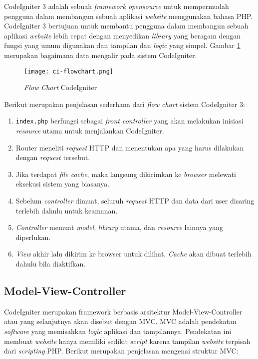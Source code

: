 CodeIgniter 3 adalah sebuah \textit{framework opensource} untuk mempermudah pengguna dalam membangun sebuah aplikasi \textit{website} menggunakan bahasa PHP. CodeIgniter 3 bertujuan untuk membantu pengguna dalam membangun sebuah aplikasi \textit{website} lebih cepat dengan menyedikan \textit{library} yang beragam dengan fungsi yang umum digunakan dan tampilan dan \textit{logic} yang simpel. Gambar \ref{fig:2:ciflowchart} merupakan bagaimana data mengalir pada sistem CodeIgniter.

\begin{figure}[H]
	\centering
	\texttt{[image: ci-flowchart.png]}
	\caption{\textit{Flow Chart} CodeIgniter}
	\label{fig:2:ciflowchart}
\end{figure}

Berikut merupakan penjelasan sederhana dari \textit{flow chart} sistem CodeIgniter 3:

\begin{enumerate}
	\item \verb|index.php| berfungsi sebagai \textit{front controller} yang akan melakukan inisiasi \textit{resource} utama untuk menjalankan CodeIgniter.
	\item Router meneliti \textit{request} HTTP dan menentukan apa yang harus dilakukan dengan \textit{request} tersebut.
	\item Jika terdapat \textit{file cache}, maka langsung dikirimkan ke \textit{browser} melewati eksekusi sistem yang biasanya.
	\item Sebelum \textit{controller} dimuat, seluruh \textit{request} HTTP dan data dari user disaring terlebih dahulu untuk keamanan.
	\item \textit{Controller} memuat \textit{model}, \textit{library} utama, dan \textit{resource} lainnya yang diperlukan.
	\item \textit{View} akhir lalu dikirim ke browser untuk dilihat. \textit{Cache} akan dibuat terlebih dahulu bila diaktifkan.
\end{enumerate}

\subsection{Model-View-Controller}
\label{sub:2:2:modelviewcontroller}

CodeIgniter merupakan framework berbasis arsitektur Model-View-Controller atau yang selanjutnya akan disebut dengan MVC. MVC adalah pendekatan \textit{software} yang memisahkan \textit{logic} aplikasi dan tampilannya. Pendekatan ini membuat \textit{website} hanya memiliki sedikit \textit{script} karena tampilan \textit{website} terpisah dari \textit{scripting} PHP. Berikut merupakan penjelasan mengenai struktur MVC:

